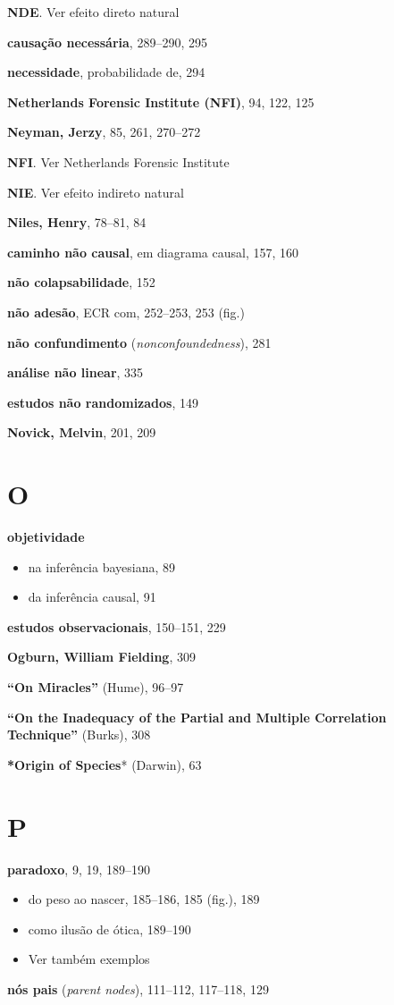 \documentclass[11pt,a5paper,twoside]{book}
\begin{document}
\textbf{NDE}. Ver efeito direto natural

\textbf{causação necessária}, 289–290, 295

\textbf{necessidade}, probabilidade de, 294

\textbf{Netherlands Forensic Institute (NFI)}, 94, 122, 125

\textbf{Neyman, Jerzy}, 85, 261, 270–272

\textbf{NFI}. Ver Netherlands Forensic Institute

\textbf{NIE}. Ver efeito indireto natural

\textbf{Niles, Henry}, 78–81, 84

\textbf{caminho não causal}, em diagrama causal, 157, 160

\textbf{não colapsabilidade}, 152

\textbf{não adesão}, ECR com, 252–253, 253 (fig.)

\textbf{não confundimento} (\textit{nonconfoundedness}), 281

\textbf{análise não linear}, 335

\textbf{estudos não randomizados}, 149

\textbf{Novick, Melvin}, 201, 209

\section{O}
\textbf{objetividade}

\begin{itemize}
\item na inferência bayesiana, 89
\item da inferência causal, 91
\end{itemize}
\textbf{estudos observacionais}, 150–151, 229

\textbf{Ogburn, William Fielding}, 309

\textbf{“On Miracles”} (Hume), 96–97

\textbf{“On the Inadequacy of the Partial and Multiple Correlation Technique”} (Burks), 308

\textbf{*Origin of Species}* (Darwin), 63

\section{P}
\textbf{paradoxo}, 9, 19, 189–190

\begin{itemize}
\item do peso ao nascer, 185–186, 185 (fig.), 189
\item como ilusão de ótica, 189–190
\item Ver também exemplos
\end{itemize}
\textbf{nós pais} (\textit{parent nodes}), 111–112, 117–118, 129
\end{document}
